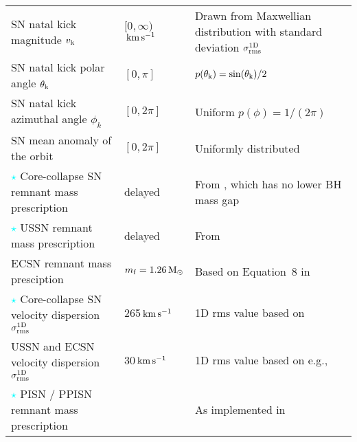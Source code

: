 \documentclass[fleqn,usenatbib, onecolumn]{mnras}
\newcommand{\vk}{\ensuremath{v_{\rm{k}}}\xspace}
\newcommand{\thetak}{\ensuremath{{\theta}_{\rm{k}}}\xspace}
\newcommand{\Msun}{\ensuremath{\,\rm{M}_{\odot}}\xspace}
\newcommand{\kms}{\ensuremath{\,\rm{km}\,\rm{s}^{-1}}\xspace}
\begin{document}
\begin{table*}
{\begin{tabular}{lll}
%
{SN} natal kick magnitude \vk                          									& $[0, \infty)$\kms & Drawn from Maxwellian distribution    with standard deviation $\sigma_{\rm{rms}}^{\rm{1D}}$          \\
%
 {SN} natal kick polar angle $\thetak$          											& $[0, \pi]$                        & $p(\thetak) = \sin(\thetak)/2$ \\
%
 {SN} natal kick azimuthal angle $\phi_k$                           					  	& $[0, 2\pi]$                        & Uniform $p(\phi) = 1/ (2 \pi)$   \\
%
 {SN} mean anomaly of the orbit                    											&     $[0, 2\pi]$                             & Uniformly distributed  \\
{\hspace{-.35cm}\Large{\textcolor{cyan}{$\star$}}}{\hspace{+.02cm}} Core-collapse  {SN} remnant mass prescription          									     &  delayed                     &  From \citet{2012ApJ...749...91F}, which  has no lower {BH} mass gap  \\%
%
{\hspace{-.35cm}\Large{\textcolor{cyan}{$\star$}}}{\hspace{+.02cm}} USSN  remnant mass prescription          									     &  delayed                     &  From \citet{2012ApJ...749...91F}   \\%
%
ECSN  remnant mass presciption                        												&                                 $m_{\rm{f}} = 1.26\Msun$ &      Based on Equation~8 in \citet{1996ApJ...457..834T}          \\
%
{\hspace{-.35cm}\Large{\textcolor{cyan}{$\star$}}}{\hspace{+.02cm}} Core-collapse  {SN}  velocity dispersion $\sigma_{\rm{rms}}^{\rm{1D}}$ 			& 265\kms           & 1D rms value based on              \citet{2005MNRAS.360..974H}                          \\
%
 USSN  and ECSN  velocity dispersion $\sigma_{\rm{rms}}^{\rm{1D}}$ 							 	& 30\kms             &            1D rms value based on e.g.,    \citet{2002ApJ...573..283P,2004ApJ...612.1044P}    \\
%
{\hspace{-.35cm}\Large{\textcolor{cyan}{$\star$}}}{\hspace{+.02cm}} PISN / PPISN remnant mass prescription               											& \citet{2019ApJ...882...36M}                    &       As implemented in \citet{2019ApJ...882..121S}      \\

\end{tabular}}
\end{table*}
\end{document}
